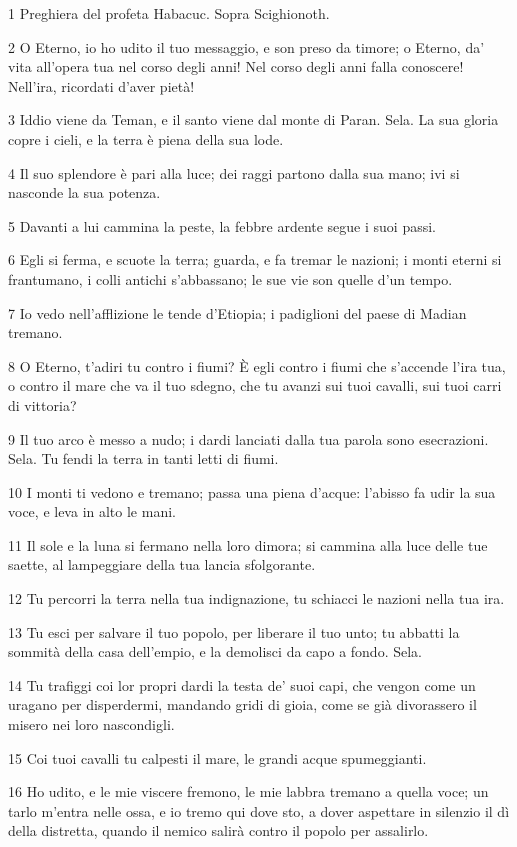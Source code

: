 \par 1 Preghiera del profeta Habacuc. Sopra Scighionoth.
\par 2 O Eterno, io ho udito il tuo messaggio, e son preso da timore; o Eterno, da' vita all'opera tua nel corso degli anni! Nel corso degli anni falla conoscere! Nell'ira, ricordati d'aver pietà!
\par 3 Iddio viene da Teman, e il santo viene dal monte di Paran. Sela. La sua gloria copre i cieli, e la terra è piena della sua lode.
\par 4 Il suo splendore è pari alla luce; dei raggi partono dalla sua mano; ivi si nasconde la sua potenza.
\par 5 Davanti a lui cammina la peste, la febbre ardente segue i suoi passi.
\par 6 Egli si ferma, e scuote la terra; guarda, e fa tremar le nazioni; i monti eterni si frantumano, i colli antichi s'abbassano; le sue vie son quelle d'un tempo.
\par 7 Io vedo nell'afflizione le tende d'Etiopia; i padiglioni del paese di Madian tremano.
\par 8 O Eterno, t'adiri tu contro i fiumi? È egli contro i fiumi che s'accende l'ira tua, o contro il mare che va il tuo sdegno, che tu avanzi sui tuoi cavalli, sui tuoi carri di vittoria?
\par 9 Il tuo arco è messo a nudo; i dardi lanciati dalla tua parola sono esecrazioni. Sela. Tu fendi la terra in tanti letti di fiumi.
\par 10 I monti ti vedono e tremano; passa una piena d'acque: l'abisso fa udir la sua voce, e leva in alto le mani.
\par 11 Il sole e la luna si fermano nella loro dimora; si cammina alla luce delle tue saette, al lampeggiare della tua lancia sfolgorante.
\par 12 Tu percorri la terra nella tua indignazione, tu schiacci le nazioni nella tua ira.
\par 13 Tu esci per salvare il tuo popolo, per liberare il tuo unto; tu abbatti la sommità della casa dell'empio, e la demolisci da capo a fondo. Sela.
\par 14 Tu trafiggi coi lor propri dardi la testa de' suoi capi, che vengon come un uragano per disperdermi, mandando gridi di gioia, come se già divorassero il misero nei loro nascondigli.
\par 15 Coi tuoi cavalli tu calpesti il mare, le grandi acque spumeggianti.
\par 16 Ho udito, e le mie viscere fremono, le mie labbra tremano a quella voce; un tarlo m'entra nelle ossa, e io tremo qui dove sto, a dover aspettare in silenzio il dì della distretta, quando il nemico salirà contro il popolo per assalirlo.
